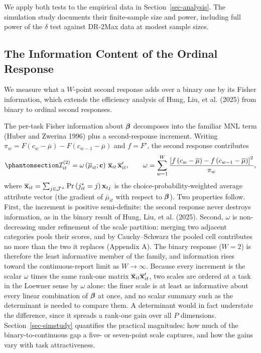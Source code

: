 \documentclass[
  letterpaper,
  DIV=11,
  numbers=noendperiod]{scrartcl}
\theoremstyle{plain}
\theoremstyle{plain}
\theoremstyle{plain}
\theoremstyle{remark}
\begin{document}
We apply both tests to the empirical data in Section~\ref{sec-analysis}.
The simulation study documents their finite-sample size and power,
including full power of the \(\delta\) test against DR-2Max data at
modest sample sizes.

\subsection{The Information Content of the Ordinal
Response}\label{sec-information}

We measure what a \(W\)-point second response adds over a binary one by
its Fisher information, which extends the efficiency analysis of Hung,
Liu, et al. (2025) from binary to ordinal second responses.

The per-task Fisher information about \(\boldsymbol{\beta}\) decomposes into the
familiar MNL term (Huber and Zwerina 1996) plus a second-response
increment. Writing
\(\pi_w = F(c_w - \overline{\mu}) - F(c_{w-1} - \overline{\mu})\) and
\(f = F'\), the second response contributes
\begin{equation}\protect\phantomsection\label{eq-fisher}{
\mathcal{I}^{(2)}_{it}
= \omega \left( \overline{\mu}_{it}; \mathbf{c} \right) \, \overline{\x}_{it} \, \overline{\x}_{it}',
\qquad
\omega = \sum_{w=1}^{W} \frac{ \left[ f \left( c_w - \overline{\mu} \right) - f \left( c_{w-1} - \overline{\mu} \right) \right]^2 }{ \pi_w },
}\end{equation} where
\(\overline{\mathbf{x}}_{it} = \sum_{j \in \mathcal{J}^+} \Pr\left(j^*_{it}=j\right) \mathbf{x}_{tj}\)
is the choice-probability-weighted average attribute vector (the
gradient of \(\overline{\mu}_{it}\) with respect to \(\boldsymbol{\beta}\)). Two
properties follow. First, the increment is positive semi-definite: the
second response never destroys information, as in the binary result of
Hung, Liu, et al. (2025). Second, \(\omega\) is non-decreasing under
refinement of the scale partition: merging two adjacent categories pools
their scores, and by Cauchy--Schwarz the pooled cell contributes no more
than the two it replaces (Appendix A). The binary response (\(W=2\)) is
therefore the least informative member of the family, and information
rises toward the continuous-report limit as \(W \to \infty\). Because
every increment is the scalar \(\omega\) times the same rank-one matrix
\(\overline{\mathbf{x}}_{it} \overline{\mathbf{x}}_{it}'\), two scales are ordered at a
task in the Loewner sense by \(\omega\) alone: the finer scale is at
least as informative about every linear combination of \(\boldsymbol{\beta}\) at
once, and no scalar summary such as the determinant is needed to compare
them. A determinant would in fact understate the difference, since it
spreads a rank-one gain over all \(P\) dimensions.
Section~\ref{sec-simstudy} quantifies the practical magnitudes: how much
of the binary-to-continuous gap a five- or seven-point scale captures,
and how the gains vary with task attractiveness.
\end{document}
